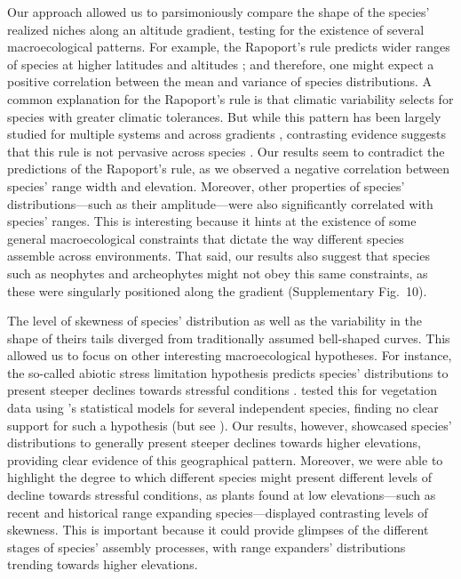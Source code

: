 \documentclass[11pt, a4paper]{article}
\begin{document}
Our approach allowed us to parsimoniously compare the shape of the species' realized niches along an altitude gradient, testing for the existence of several macroecological patterns. For example, the Rapoport's rule predicts wider ranges of species at higher latitudes and altitudes \citep{stevensElevationalGradientAltitudinal1992}; and therefore, one might expect a positive correlation between the mean and variance of species distributions. A common explanation for the Rapoport's rule is that climatic variability selects for species with greater climatic tolerances. But while this pattern has been largely studied for multiple systems and across gradients \citep{mccainElevationalRapoportRule2013}, contrasting evidence suggests that this rule is not pervasive across species \citep{ribasRapoportEffectWidespread2006, bhattaraiCanRapoportRule2006, mccainElevationalRapoportRule2013}. Our results seem to contradict the predictions of the Rapoport's rule, as we observed a negative correlation between species' range  width and elevation. Moreover, other properties of species' distributions---such as their amplitude---were also significantly correlated with species' ranges. This is interesting because it hints at the existence of some general macroecological constraints that dictate the way different species assemble across environments. That said, our results also suggest that species such as neophytes and archeophytes might not obey this same constraints, as these were singularly positioned along the gradient (Supplementary Fig.~10). 

The level of skewness of species' distribution as well as the variability in the shape of theirs tails diverged from traditionally assumed bell-shaped curves. This allowed us to focus on other interesting macroecological hypotheses. For instance, the so-called abiotic stress limitation hypothesis predicts species' distributions to present steeper declines towards stressful conditions \citep{austinCommunityTheoryCompetition1990}. \citet{normandImportanceAbioticStress2009} tested this for vegetation data using \citeauthor{huismanHierarchicalSetModels1993}'s statistical models for several independent species, finding no clear support for such a hypothesis (but see \citealt{ziffer-bergerSpatialPatternsProvide2014}). Our results, however, showcased species' distributions to generally present steeper declines towards higher elevations, providing clear evidence of this geographical pattern. Moreover, we were able to highlight the degree to which different species might present different levels of decline towards stressful conditions, as plants found at low elevations---such as recent and historical range expanding species---displayed contrasting levels of skewness. This is important because it could provide glimpses of the different stages of species' assembly processes, with range expanders' distributions trending towards higher elevations. 
\end{document}
